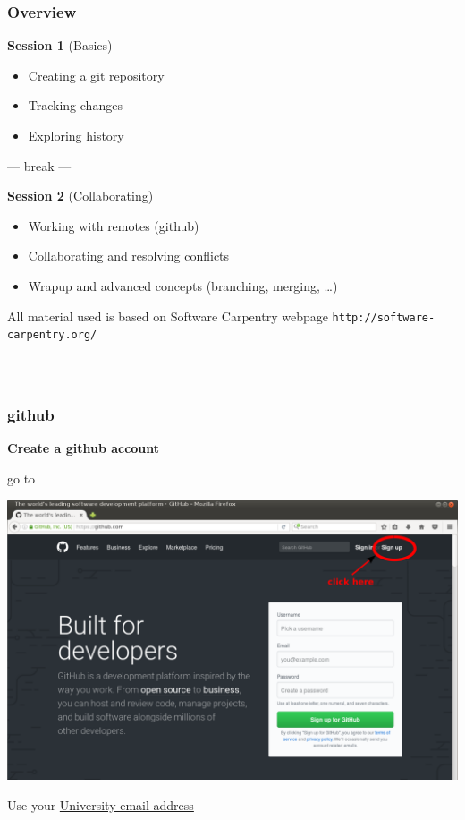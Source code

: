 \documentclass{beamer}
\begin{document}
\begin{frame}
  \frametitle{Overview}
  \textbf{\Large Session 1} (Basics) {\color{red}{13:15h - 14:25h}}
  \begin{itemize}
  \item Creating a git repository
  \item Tracking changes
  \item Exploring history
  \end{itemize}
  \vspace{-1ex}
  \begin{center}
  --- break ---
  \end{center}
  \vspace{-1ex}
  \textbf{\Large Session 2} (Collaborating) {\color{red}{14:40h - 16:05h}}
  \begin{itemize}
  \item Working with remotes (github)
  \item Collaborating and resolving conflicts
  \item Wrapup and advanced concepts (branching, merging, \dots)
  \end{itemize}
  \vspace{1ex}
  All material used is based on Software Carpentry webpage \texttt{http://software-carpentry.org/}
\end{frame}


\begin{frame}
  \frametitle{${}^{}$}
\end{frame}


\begin{frame}
  \frametitle{github}
  \textbf{Create a github account}
  \begin{center}
    go to {}
  \end{center}
  \begin{center}
    \includegraphics[width=0.75\linewidth]{github.pdf}
  \end{center}
  Use your \underline{University email address}
\end{frame}
\end{document}
